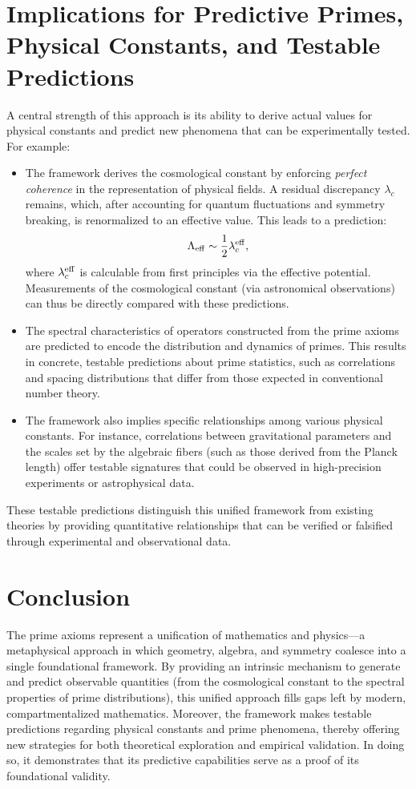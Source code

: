 \documentclass[12pt]{article}
\begin{document}
\section*{Implications for Predictive Primes, Physical Constants, and Testable Predictions}
A central strength of this approach is its ability to derive actual values for physical constants and predict new phenomena that can be experimentally tested. For example:
\begin{itemize}
    \item The framework derives the cosmological constant by enforcing \emph{perfect coherence} in the representation of physical fields. A residual discrepancy \(\lambda_c\) remains, which, after accounting for quantum fluctuations and symmetry breaking, is renormalized to an effective value. This leads to a prediction:
    \[
    \Lambda_{\rm eff} \sim \frac{1}{2}\lambda_c^{\rm eff},
    \]
    where \(\lambda_c^{\rm eff}\) is calculable from first principles via the effective potential. Measurements of the cosmological constant (via astronomical observations) can thus be directly compared with these predictions.
    \item The spectral characteristics of operators constructed from the prime axioms are predicted to encode the distribution and dynamics of primes. This results in concrete, testable predictions about prime statistics, such as correlations and spacing distributions that differ from those expected in conventional number theory.
    \item The framework also implies specific relationships among various physical constants. For instance, correlations between gravitational parameters and the scales set by the algebraic fibers (such as those derived from the Planck length) offer testable signatures that could be observed in high-precision experiments or astrophysical data.
\end{itemize}
These testable predictions distinguish this unified framework from existing theories by providing quantitative relationships that can be verified or falsified through experimental and observational data.

\section*{Conclusion}
The prime axioms represent a unification of mathematics and physics---a metaphysical approach in which geometry, algebra, and symmetry coalesce into a single foundational framework. By providing an intrinsic mechanism to generate and predict observable quantities (from the cosmological constant to the spectral properties of prime distributions), this unified approach fills gaps left by modern, compartmentalized mathematics. Moreover, the framework makes testable predictions regarding physical constants and prime phenomena, thereby offering new strategies for both theoretical exploration and empirical validation. In doing so, it demonstrates that its predictive capabilities serve as a proof of its foundational validity.
\end{document}
